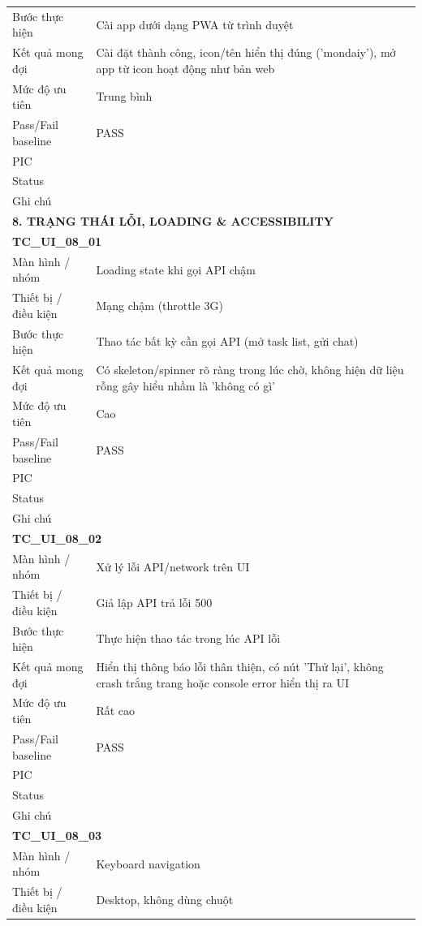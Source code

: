 \documentclass[12pt,a4paper]{article}
\begin{document}
\begin{longtable}{p{3.0cm}p{11.5cm}}
Bước thực hiện & Cài app dưới dạng PWA từ trình duyệt \\
Kết quả mong đợi & Cài đặt thành công, icon/tên hiển thị đúng ('mondaiy'), mở app từ icon hoạt động như bản web \\
Mức độ ưu tiên & Trung bình \\
Pass/Fail baseline & PASS \\
PIC &  \\
Status &  \\
Ghi chú &  \\
\midrule
\multicolumn{2}{l}{\textbf{8. TRẠNG THÁI LỖI, LOADING \& ACCESSIBILITY}} \\ \midrule
\multicolumn{2}{l}{\textbf{TC\_UI\_08\_01}} \\
Màn hình / nhóm & Loading state khi gọi API chậm \\
Thiết bị / điều kiện & Mạng chậm (throttle 3G) \\
Bước thực hiện & Thao tác bất kỳ cần gọi API (mở task list, gửi chat) \\
Kết quả mong đợi & Có skeleton/spinner rõ ràng trong lúc chờ, không hiện dữ liệu rỗng gây hiểu nhầm là 'không có gì' \\
Mức độ ưu tiên & Cao \\
Pass/Fail baseline & PASS \\
PIC &  \\
Status &  \\
Ghi chú &  \\
\midrule
\multicolumn{2}{l}{\textbf{TC\_UI\_08\_02}} \\
Màn hình / nhóm & Xử lý lỗi API/network trên UI \\
Thiết bị / điều kiện & Giả lập API trả lỗi 500 \\
Bước thực hiện & Thực hiện thao tác trong lúc API lỗi \\
Kết quả mong đợi & Hiển thị thông báo lỗi thân thiện, có nút 'Thử lại', không crash trắng trang hoặc console error hiển thị ra UI \\
Mức độ ưu tiên & Rất cao \\
Pass/Fail baseline & PASS \\
PIC &  \\
Status &  \\
Ghi chú &  \\
\midrule
\multicolumn{2}{l}{\textbf{TC\_UI\_08\_03}} \\
Màn hình / nhóm & Keyboard navigation \\
Thiết bị / điều kiện & Desktop, không dùng chuột \\

\end{longtable}
\end{document}
